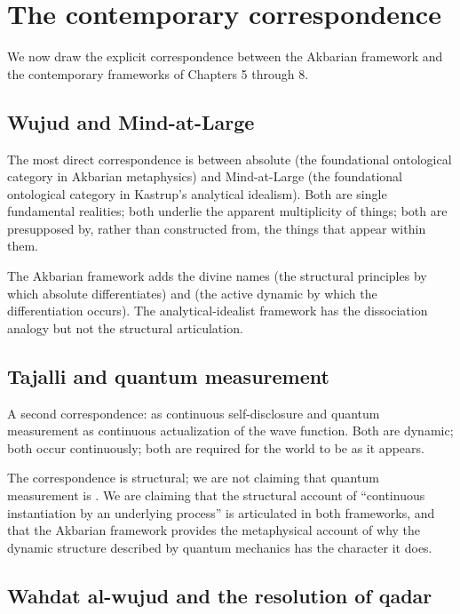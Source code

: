 \section{The contemporary correspondence}
\label{sec:contemporary-correspondence}

We now draw the explicit correspondence between the Akbarian
framework and the contemporary frameworks of Chapters 5 through 8.

\subsection{Wujud and Mind-at-Large}

The most direct correspondence is between absolute  (the
foundational ontological category in Akbarian metaphysics) and
Mind-at-Large (the foundational ontological category in Kastrup's
analytical idealism). Both are single fundamental realities; both
underlie the apparent multiplicity of things; both are presupposed
by, rather than constructed from, the things that appear within
them.

The Akbarian framework adds the divine names (the structural
principles by which absolute  differentiates) and
 (the active dynamic by which the differentiation
occurs). The analytical-idealist framework has the dissociation
analogy but not the structural articulation.

\subsection{Tajalli and quantum measurement}

A second correspondence:  as continuous self-disclosure
and quantum measurement as continuous actualization of the wave
function. Both are dynamic; both occur continuously; both are
required for the world to be as it appears.

The correspondence is structural; we are not claiming that quantum
measurement is . We are claiming that the structural
account of ``continuous instantiation by an underlying process''
is articulated in both frameworks, and that the Akbarian framework
provides the metaphysical account of why the dynamic structure
described by quantum mechanics has the character it does.

\subsection{Wahdat al-wujud and the resolution of qadar}

